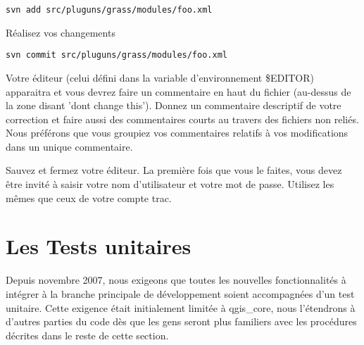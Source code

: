 \begin{verbatim}
svn add src/pluguns/grass/modules/foo.xml
\end{verbatim}

Réalisez vos changements

\begin{verbatim}
svn commit src/pluguns/grass/modules/foo.xml
\end{verbatim}

Votre éditeur (celui défini dans la variable d'environnement \$EDITOR) apparaitra et vous devrez faire un commentaire en haut du fichier (au-dessus de la zone disant 'dont change this'). Donnez un commentaire descriptif de votre correction et faire aussi des commentaires courts au travers des fichiers non reliés. Nous préférons que vous groupiez vos commentaires relatifs à vos modifications dans un unique commentaire.

Sauvez et fermez votre éditeur. La première fois que vous le faites, vous devez être invité à saisir votre nom d'utilisateur et votre mot de passe. Utilisez les mêmes que ceux de votre compte trac.

\section{Les Tests unitaires}
Depuis novembre 2007, nous exigeons que toutes les nouvelles fonctionnalités à intégrer à la branche principale de développement soient accompagnées d'un test unitaire. Cette exigence était initialement limitée à qgis\_core, nous l'étendrons à d'autres parties du code dès que les gens seront plus familiers avec les procédures décrites dans le reste de cette section.

